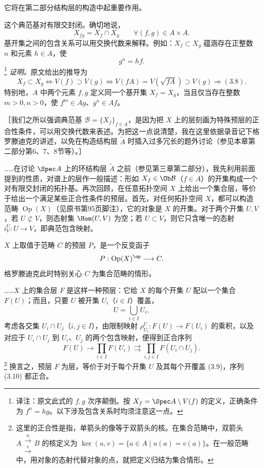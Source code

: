 它将在第二部分结构层的构造中起重要作用。

这个典范基对有限交封闭。确切地说，
\begin{equation}\tag{3.7}
X_{fg}=X_f\cap X_g\qquad\forall(f,g)\in A\times A.
\end{equation}
基开集之间的包含关系可以用交换代数来解释。例如：$X_f\subset X_g$ 蕴涵存在正整数 $n$ 和元素 $h\in A$，使
\begin{equation}\tag{3.8}
g^n=hf.
\end{equation}
\footnote{译注：原文此式的 $f,g$ 次序颠倒。按 $X_f=\Spec A\setminus V(f)$ 的定义，正确条件为 $f^n=hg$。以下涉及包含关系时均须注意这一点。}
\textit{证明。}原文给出的推导为
\[
X_f\subset X_g\iff V(f)\supset V(g)
\iff V(fA)=V(\sqrt{fA})\supset V(g)\Longrightarrow(3.8).
\]
特别地，$A$ 中两个元素 $f,g$ 定义同一个基开集 $X_f=X_g$，当且仅当存在整数 $m>0,n>0$，使 $f^m\in Ag$、$g^n\in Af$。

［我们之所以强调典范基 $\mathcal B=\{X_f\}_{f\in A}$，是因为把 $X$ 上的层刻画为特殊预层的正合性条件，可以用交换代数来表述。为把这一点说清楚，我在这里依据录音记下格罗滕迪克的讲述，以免在构造结构层 $\widetilde A$ 时插入过多冗长的题外讨论（参见本章第二部分第6、7、8节等）。］

……在讨论 $\Spec A$ 上的环结构层 $\widetilde A$ 之前（参见第三章第二部分），我先利用前面提到的性质，对谱上的层作一般描述：形如 $X_f\in\Ob\mathcal B$（$f\in A$）的开集构成一个对有限交封闭的拓扑基。再次回顾，在任意拓扑空间 $X$ 上给出一个集合层，等价于给出一个满足某些正合性条件的预层。首先，对任何拓扑空间 $X$，都可以构造范畴 $\operatorname{Op}(X)$（见原书第95页脚注），它的对象是 $X$ 的开集。对于两个开集 $U,V$，若 $U\not\subset V$，则态射集 $\Hom(U,V)$ 为空；若 $U\subset V$，则它只含唯一的态射 $i_V^U:U\to V$，即典范包含映射。

$X$ 上取值于范畴 $C$ 的预层 $P$，是一个反变函子
\[
P:\operatorname{Op}(X)^{\op}\longrightarrow C.
\]
格罗滕迪克此时特别关心 $C$ 为集合范畴的情形。

……$X$ 上的集合层 $F$ 是这样一种预层：它给 $X$ 的每个开集 $U$ 配以一个集合 $F(U)$；而且，只要 $U$ 被开集 $U_i$（$i\in I$）覆盖，
\begin{equation}\tag{3.9}
U=\bigcup_{i\in I}U_i,
\end{equation}
考虑各交集 $U_i\cap U_j$（$i,j\in I$），由限制映射 $\rho_{U_i}^U:F(U)\to F(U_i)$ 的乘积，以及对应于 $U_i\cap U_j$ 到 $U_i$、$U_j$ 的两个包含映射，便得到正合序列
\begin{equation}\tag{3.10}
F(U)\longrightarrow\prod_{i\in I}F(U_i)
\rightrightarrows\prod_{i,j\in I}F(U_i\cap U_j).
\end{equation}
\footnote{这里的正合性是指，单箭头的像等于双箭头的核。在集合范畴中，双箭头 $A\mathrel{\substack{\xrightarrow{u}\\[-.6ex]\xrightarrow{v}}}B$ 的核定义为 $\ker(u,v)=\{a\in A\mid u(a)=v(a)\}$。在一般范畴中，用对象的态射代替对象的点，就把定义归结为集合情形。}
换言之，预层 $F$ 为层，等价于对于每个开集 $U$ 及其每个开覆盖 (3.9)，序列 (3.10) 都正合。

